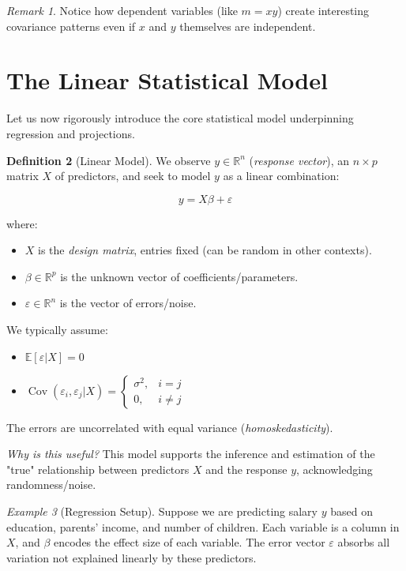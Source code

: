 \documentclass[11pt,a4paper]{article}
\theoremstyle{definition}
\newtheorem{definition}{Definition}[section]
\theoremstyle{plain}
\theoremstyle{remark}
\newtheorem{remark}[definition]{Remark}
\newtheorem{example}[definition]{Example}
\begin{document}
\begin{remark}
Notice how dependent variables (like $m = x y$) create interesting covariance patterns even if $x$ and $y$ themselves are independent.
\end{remark}

\section{The Linear Statistical Model}

Let us now rigorously introduce the core statistical model underpinning regression and projections.

\begin{definition}[Linear Model]
We observe $y \in \mathbb{R}^n$ (\emph{response vector}), an $n \times p$ matrix $X$ of predictors, and seek to model $y$ as a linear combination:

\[
y = X \beta + \varepsilon
\]

where:
\begin{itemize}
    \item $X$ is the \emph{design matrix}, entries fixed (can be random in other contexts).
    \item $\beta \in \mathbb{R}^p$ is the unknown vector of coefficients/parameters.
    \item $\varepsilon \in \mathbb{R}^n$ is the vector of errors/noise.
\end{itemize}
We typically assume:
\begin{itemize}
    \item $\mathbb{E}[\varepsilon|X] = 0$
    \item $\operatorname{Cov}(\varepsilon_i, \varepsilon_j | X) = 
    \begin{cases}
        \sigma^2, & i = j \\
        0, & i \neq j
    \end{cases}$
\end{itemize}
The errors are uncorrelated with equal variance (\emph{homoskedasticity}).
\end{definition}

\emph{Why is this useful?} This model supports the inference and estimation of the "true" relationship between predictors $X$ and the response $y$, acknowledging randomness/noise.

\begin{example}[Regression Setup]
Suppose we are predicting salary $y$ based on education, parents' income, and number of children. Each variable is a column in $X$, and $\beta$ encodes the effect size of each variable. The error vector $\varepsilon$ absorbs all variation not explained linearly by these predictors.
\end{example}
\end{document}
